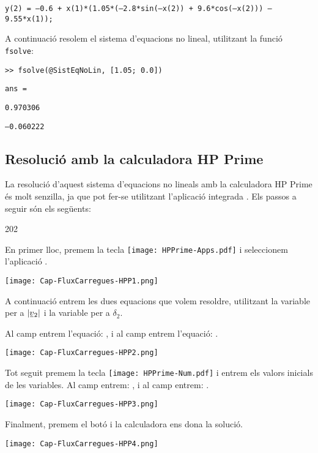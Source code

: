 \hspace{1cm}\texttt{y(2) = --0.6 + x(1)*(1.05*(--2.8*sin(--x(2)) + 9.6*cos(--x(2))) -- 9.55*x(1));}

A continuació resolem el sistema d'equacions no lineal, utilitzant la funció \texttt{fsolve}:

\hspace{1cm}\texttt{>{}> fsolve(@SistEqNoLin, [1.05; 0.0])}

\hspace{1cm}\texttt{ans =}

\hspace{1cm}\texttt{\phantom{ans --}0.970306}

\hspace{1cm}\texttt{\phantom{ans }--0.060222}

\subsection{Resolució amb la calculadora \textsf{HP Prime}}

La resolució d'aquest sistema d'equacions no lineals amb la calculadora \textsf{HP Prime} és molt senzilla, ja que pot fer-se utilitzant l'aplicació integrada . Els passos a seguir són els següents:

\begin{dingautolist}{202}

    \item En primer lloc, premem la tecla \texttt{[image: HPPrime-Apps.pdf]} i seleccionem l'aplicació .

         \texttt{[image: Cap-FluxCarregues-HPP1.png]}

    \item A continuació entrem les dues equacions que volem resoldre, utilitzant la variable  per a $|\cmplx{v}_2|$ i la variable  per a $\delta_2$.

        Al camp  entrem l'equació: , i al camp  entrem l'equació: .

        \texttt{[image: Cap-FluxCarregues-HPP2.png]}

    \item Tot seguit premem la tecla \texttt{[image: HPPrime-Num.pdf]} i entrem els valors inicials de les variables. Al camp  entrem: , i al camp  entrem: .

        \texttt{[image: Cap-FluxCarregues-HPP3.png]}

    \item  Finalment, premem el botó  i la calculadora ens dona  la solució.

        \texttt{[image: Cap-FluxCarregues-HPP4.png]}

\end{dingautolist}

